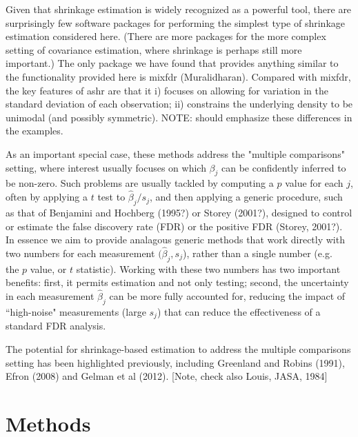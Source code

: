\documentclass[10pt]{article}
\begin{document}
Given that shrinkage estimation is widely recognized as a powerful tool, there are surprisingly few software packages for performing the simplest type of shrinkage estimation considered here. (There are more packages for the more complex setting of covariance estimation, where shrinkage is perhaps still more important.)
The only package we have found that provides anything similar
to the functionality provided here is mixfdr (Muralidharan). Compared with mixfdr, the key features of ashr are that it
i) focuses on allowing for variation in the standard deviation of each observation; ii) constrains the underlying density to be unimodal (and possibly symmetric).
NOTE: should emphasize these differences in the examples.

As an important special case, these methods address the "multiple comparisons" setting, where interest usually focuses on which $\beta_j$ can be confidently inferred to be non-zero. Such problems are usually tackled by computing a $p$ value for each $j$, often by applying a $t$ test to $\hat\beta_j/s_j$,
and then applying a generic procedure, such as that of Benjamini 
and Hochberg (1995?) or Storey (2001?), designed to control or
estimate the false discovery rate (FDR) or the positive FDR (Storey, 2001?). In essence we aim to provide analagous
generic methods that work directly with two numbers for each 
measurement $(\hat\beta_j,s_j$), rather than a single number (e.g.~ the $p$ value, or $t$ statistic). Working with these two numbers has two important benefits: first, it permits estimation and not only testing; second, the 
uncertainty in each measurement $\hat\beta_j$ can be more fully accounted for, reducing the impact of ``high-noise" measurements (large $s_j$) that can reduce the effectiveness of a standard FDR analysis. 

The potential for shrinkage-based estimation to
address the multiple comparisons setting 
has been highlighted
previously, including Greenland and Robins (1991),
Efron (2008) and Gelman et al (2012). [Note, check also Louis, JASA, 1984] 


 \section*{Methods}
 
\end{document}

